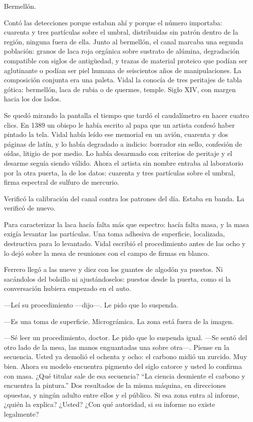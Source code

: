 Bermellón.

Contó las detecciones porque estaban ahí y porque el número importaba: cuarenta y tres partículas sobre el umbral, distribuidas sin patrón dentro de la región, ninguna fuera de ella. Junto al bermellón, el canal marcaba una segunda población: granos de laca roja orgánica sobre sustrato de alúmina, degradación compatible con siglos de antigüedad, y trazas de material proteico que podían ser aglutinante o podían ser piel humana de seiscientos años de manipulaciones. La composición conjunta era una paleta. Vidal la conocía de tres peritajes de tabla gótica: bermellón, laca de rubia o de quermes, temple. Siglo XIV, con margen hacia los dos lados.

Se quedó mirando la pantalla el tiempo que tardó el caudalímetro en hacer cuatro clics. En 1389 un obispo le había escrito al papa que un artista confesó haber pintado la tela. Vidal había leído ese memorial en un avión, cuarenta y dos páginas de latín, y lo había degradado a indicio: borrador sin sello, confesión de oídas, litigio de por medio. Lo había desarmado con criterios de peritaje y el desarme seguía siendo válido. Ahora el artista sin nombre entraba al laboratorio por la otra puerta, la de los datos: cuarenta y tres partículas sobre el umbral, firma espectral de sulfuro de mercurio.

Verificó la calibración del canal contra los patrones del día. Estaba en banda. La verificó de nuevo.

Para caracterizar la laca hacía falta más que espectro: hacía falta masa, y la masa exigía levantar las partículas. Una toma adhesiva de superficie, localizada, destructiva para lo levantado. Vidal escribió el procedimiento antes de las ocho y lo dejó sobre la mesa de reuniones con el campo de firmas en blanco.

Ferrero llegó a las nueve y diez con los guantes de algodón ya puestos. Ni sacándolos del bolsillo ni ajustándoselos: puestos desde la puerta, como si la conversación hubiera empezado en el auto.

---Leí su procedimiento ---dijo---. Le pido que lo suspenda.

---Es una toma de superficie. Micrográmica. La zona está fuera de la imagen.

---Sé leer un procedimiento, doctor. Le pido que lo suspenda igual. ---Se sentó del otro lado de la mesa, las manos enguantadas una sobre otra---. Piense en la secuencia. Usted ya demolió el ochenta y ocho: el carbono midió un zurcido. Muy bien. Ahora su modelo encuentra pigmento del siglo catorce y usted lo confirma con masa. ¿Qué titular sale de esa secuencia? ``La ciencia desmiente el carbono y encuentra la pintura.'' Dos resultados de la misma máquina, en direcciones opuestas, y ningún adulto entre ellos y el público. Si esa zona entra al informe, ¿quién la explica? ¿Usted? ¿Con qué autoridad, si su informe no existe legalmente?

